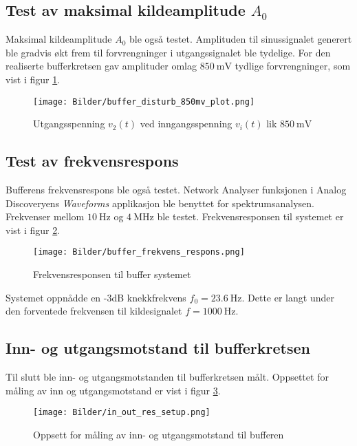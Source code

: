\subsection{Test av maksimal kildeamplitude $A_0$}
Maksimal kildeamplitude $A_0$ ble også testet. Amplituden til sinussignalet generert ble gradvis økt frem til 
forvrengninger i utgangssignalet ble tydelige. For den realiserte bufferkretsen gav amplituder omlag $\SI{850}{\milli\volt}$ 
tydlige forvrengninger, som vist i figur \ref{fig:buffer_disturb_850mv_plot}.

\begin{figure}[H]
    \centering 
    \texttt{[image: Bilder/buffer\_disturb\_850mv\_plot.png]}
    \caption{Utgangsspenning $v_2(t)$ ved inngangsspenning $v_i(t)$ lik $\SI{850}{\milli\volt}$}
    \label{fig:buffer_disturb_850mv_plot}
\end{figure}

\subsection{Test av frekvensrespons}
Bufferens frekvensrespons ble også testet. Network Analyser funksjonen i 
Analog Discoveryens \textit{Waveforms} applikasjon ble benyttet for spektrumsanalysen. Frekvenser mellom
$\SI{10}{\hertz}$ og $\SI{4}{\mega\hertz}$ ble testet. Frekvensresponsen til systemet er vist i figur \ref{fig:buffer_frekvens_respons}.
\begin{figure}[H]
    \centering 
    \texttt{[image: Bilder/buffer\_frekvens\_respons.png]}
    \caption{Frekvensresponsen til buffer systemet}
    \label{fig:buffer_frekvens_respons}
\end{figure}

Systemet oppnådde en -3dB knekkfrekvens $f_0 = \SI{23.6}{\hertz}$. Dette er langt under den forventede 
frekvensen til kildesignalet $f = \SI{1000}{\hertz}$.

\subsection{Inn- og utgangsmotstand til bufferkretsen}
Til slutt ble inn- og utgangsmotstanden til bufferkretsen målt. Oppsettet for måling av inn og utgangsmotstand 
er vist i figur \ref{fig:in_out_res_measure_setup}.

\begin{figure}[H]
    \centering
    \texttt{[image: Bilder/in\_out\_res\_setup.png]}
    \caption{Oppsett for måling av inn- og utgangsmotstand til bufferen}
    \label{fig:in_out_res_measure_setup}
\end{figure}


